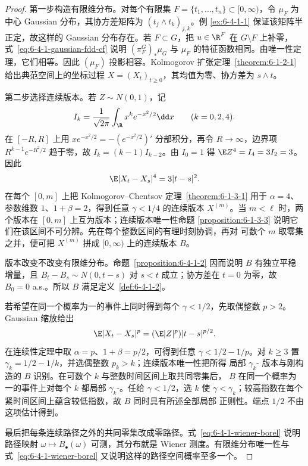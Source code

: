 \begin{proof}
第一步构造有限维分布。对每个有限集 $F=\{t_1,\ldots,t_n\}\subset[0,\infty)$，令
$\mu_F$ 为中心 Gaussian 分布，其协方差矩阵为 $(t_j\wedge t_k)_{j,k}$。例
\ref{ex:6-4-1-1} 保证该矩阵半正定，故这样的 Gaussian 分布存在。若 $F\subset G$，把
$u\in\R^F$ 在 $G\setminus F$ 上补零，式~\eqref{eq:6-4-1-gaussian-fdd-cf} 说明
$(\pi_F^G)_*\mu_G$ 与 $\mu_F$ 的特征函数相同。由唯一性定理，它们相等。因此
$(\mu_F)$ 投影相容。Kolmogorov 扩张定理~\ref{theorem:6-1-2-1} 给出典范空间上的坐标过程
$X=(X_t)_{t\ge0}$，其均值为零、协方差为 $s\wedge t$。

第二步选择连续版本。若 $Z\sim N(0,1)$，记
\[
 I_k=\frac1{\sqrt{2\pi}}\int_{\R}x^ke^{-x^2/2}\dd x\qquad(k=0,2,4).
\]
在 $[-R,R]$ 上用 $xe^{-x^2/2}=-(e^{-x^2/2})'$ 分部积分，再令 $R\to\infty$，边界项
$R^{k-1}e^{-R^2/2}$ 趋于零，故 $I_k=(k-1)I_{k-2}$。由 $I_0=1$ 得
$\E Z^4=I_4=3I_2=3$。因此
\[
 \E|X_t-X_s|^4=3|t-s|^2.
\]
在每个 $[0,m]$ 上把 Kolmogorov--Chentsov 定理~\ref{theorem:6-1-3-1} 用于
$\alpha=4$、参数维数 $1$、$1+\beta=2$，得到任意 $\gamma<1/4$ 的连续版本
$X^{(m)}$。当 $m<\ell$ 时，两个版本在 $[0,m]$ 上互为版本；连续版本唯一性命题
\ref{proposition:6-1-3-3} 说明它们在该区间不可分辨。先在每个整数区间的有理时刻协调，再对
可数个 $m$ 取零集之并，便可把 $X^{(m)}$ 拼成 $[0,\infty)$ 上的连续版本 $B$。

版本改变不改变有限维分布。命题~\ref{proposition:6-4-1-2} 因而说明 $B$ 有独立平稳增量，且
$B_t-B_s\sim N(0,t-s)$ 对 $s<t$ 成立；协方差在 $t=0$ 为零，故 $B_0=0$ a.s.。所以 $B$
满足定义~\ref{def:6-4-1-2}。

若希望在同一个概率为一的事件上同时得到每个 $\gamma<1/2$，先取偶整数 $p>2$。Gaussian 缩放给出
\[
 \E|X_t-X_s|^p=(\E|Z|^p)|t-s|^{p/2}.
\]
在连续性定理中取 $\alpha=p$、$1+\beta=p/2$，可得到任意
$\gamma<1/2-1/p$。对 $k\ge3$ 置 $\gamma_k=1/2-1/k$，并选偶整数 $p_k>k$；连续版本唯一性把所得
局部 $\gamma_k$-\Holder{} 版本与刚构造的 $B$ 识别。在可数个 $k$ 与整数时间区间上取共同零集后，
$B$ 在同一个概率为一的事件上对每个 $k$ 都局部 $\gamma_k$-\Holder{}。任给 $\gamma<1/2$，选
$k$ 使 $\gamma<\gamma_k$；较高指数在每个紧时间区间上蕴含较低指数，故 $B$ 同时具有所述全部局部
\Holder{} 正则性。端点 $1/2$ 不由这项估计得到。

最后把每条连续路径之外的共同零集改成零路径。式~\eqref{eq:6-4-1-wiener-borel} 说明路径映射
$\omega\mapsto B_\bullet(\omega)$ 可测，其分布就是 Wiener 测度。有限维分布唯一性与
式~\eqref{eq:6-4-1-wiener-borel} 又说明这样的路径空间概率至多一个。
\end{proof}

